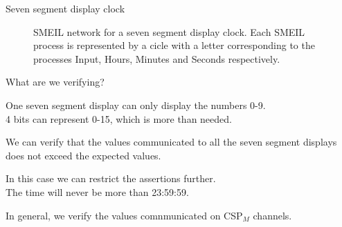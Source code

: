 \documentclass[13pt]{beamer}
\newcommand{\cspm}{CSP$_M$}
\begin{document}
\begin{frame}{Seven segment display clock}
 \begin{block}{}
  \begin{figure}[!ht]
  \centering
  \caption{SMEIL network for a seven segment display clock. Each SMEIL process is represented by a cicle with a letter corresponding to the processes Input, Hours, Minutes and Seconds respectively.}
  \label{fig:smeil_network}
\end{figure}
 \end{block}
\end{frame}

\begin{frame}{What are we verifying?}
 \begin{block}{}
   One seven segment display can only display the numbers 0-9. \\
   4 bits can represent 0-15, which is more than needed.
 \end{block}

 \pause

 \begin{block}{}
   We can verify that the values communicated to all the seven segment displays does not exceed the expected values.
 \end{block}

  \pause

  \begin{block}{}
    In this case we can restrict the assertions further. \\
    The time will never be more than 23:59:59.
  \end{block}


 \pause

 \begin{block}{}
   In general, we verify the values comnmunicated on \cspm{} channels.
 \end{block}
\end{frame}
\end{document}
